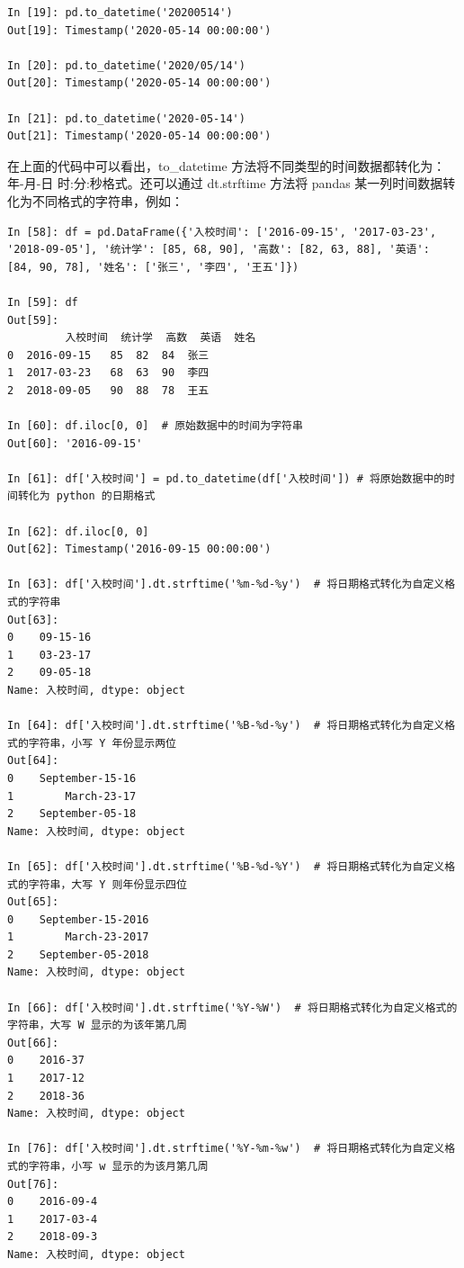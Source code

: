 \begin{lstlisting}[Language=Python]
In [19]: pd.to_datetime('20200514')
Out[19]: Timestamp('2020-05-14 00:00:00')

In [20]: pd.to_datetime('2020/05/14')
Out[20]: Timestamp('2020-05-14 00:00:00')

In [21]: pd.to_datetime('2020-05-14')
Out[21]: Timestamp('2020-05-14 00:00:00')
\end{lstlisting}

在上面的代码中可以看出，to\_datetime 方法将不同类型的时间数据都转化为：年-月-日 时:分:秒格式。还可以通过 dt.strftime 方法将 pandas 某一列时间数据转化为不同格式的字符串，例如：

\begin{lstlisting}[Language=Python]
In [58]: df = pd.DataFrame({'入校时间': ['2016-09-15', '2017-03-23', '2018-09-05'], '统计学': [85, 68, 90], '高数': [82, 63, 88], '英语': [84, 90, 78], '姓名': ['张三', '李四', '王五']})

In [59]: df
Out[59]:
         入校时间  统计学  高数  英语  姓名
0  2016-09-15   85  82  84  张三
1  2017-03-23   68  63  90  李四
2  2018-09-05   90  88  78  王五

In [60]: df.iloc[0, 0]  # 原始数据中的时间为字符串
Out[60]: '2016-09-15'

In [61]: df['入校时间'] = pd.to_datetime(df['入校时间']) # 将原始数据中的时间转化为 python 的日期格式

In [62]: df.iloc[0, 0]
Out[62]: Timestamp('2016-09-15 00:00:00')

In [63]: df['入校时间'].dt.strftime('%m-%d-%y')  # 将日期格式转化为自定义格式的字符串
Out[63]:
0    09-15-16
1    03-23-17
2    09-05-18
Name: 入校时间, dtype: object

In [64]: df['入校时间'].dt.strftime('%B-%d-%y')  # 将日期格式转化为自定义格式的字符串，小写 Y 年份显示两位
Out[64]:
0    September-15-16
1        March-23-17
2    September-05-18
Name: 入校时间, dtype: object

In [65]: df['入校时间'].dt.strftime('%B-%d-%Y')  # 将日期格式转化为自定义格式的字符串，大写 Y 则年份显示四位
Out[65]:
0    September-15-2016
1        March-23-2017
2    September-05-2018
Name: 入校时间, dtype: object

In [66]: df['入校时间'].dt.strftime('%Y-%W')  # 将日期格式转化为自定义格式的字符串，大写 W 显示的为该年第几周
Out[66]:
0    2016-37
1    2017-12
2    2018-36
Name: 入校时间, dtype: object

In [76]: df['入校时间'].dt.strftime('%Y-%m-%w')  # 将日期格式转化为自定义格式的字符串，小写 w 显示的为该月第几周
Out[76]:
0    2016-09-4
1    2017-03-4
2    2018-09-3
Name: 入校时间, dtype: object
\end{lstlisting}

